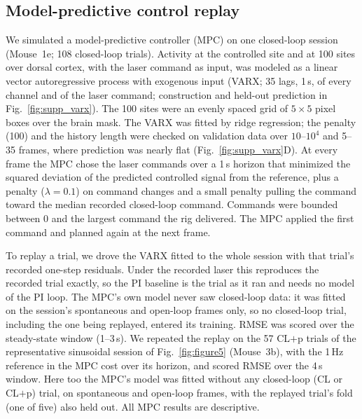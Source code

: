 \subsection*{Model-predictive control replay}
\label{sec:mpc}

We simulated a model-predictive controller (MPC) on one closed-loop session
(Mouse~1e; 108 closed-loop trials). Activity at the controlled site
and at 100 sites over dorsal cortex, with the laser command as input, was
modeled as a linear vector autoregressive process with exogenous input (VARX;
35 lags, 1\,s, of every channel and of the laser command; construction and
held-out prediction in Fig.~\ref{fig:supp_varx}). The 100 sites were an evenly
spaced grid of $5 \times 5$ pixel boxes over the brain mask. The VARX was fitted
by ridge regression; the penalty (100) and the history length were checked on
validation data over $10$--$10^{4}$ and 5--35 frames, where prediction was nearly
flat (Fig.~\ref{fig:supp_varx}D). At
every frame the MPC chose the laser commands over a 1\,s horizon that minimized
the squared deviation of the predicted controlled signal from the reference,
plus a penalty ($\lambda = 0.1$) on command changes and a small penalty pulling
the command toward the median recorded closed-loop command. Commands were
bounded between 0 and the largest command the rig delivered. The MPC applied
the first command and planned again at the next frame.

To replay a trial, we drove the VARX fitted to the whole session with that
trial's recorded one-step residuals. Under the recorded laser this reproduces
the recorded trial exactly, so the PI baseline is the trial as it ran and needs
no model of the PI loop. The MPC's own model never saw closed-loop data: it was
fitted on the session's spontaneous and open-loop frames only, so no closed-loop
trial, including the one being replayed, entered its training. RMSE was scored
over the steady-state window (1--3\,s).
We repeated the replay on the 57 CL$+$p trials of the representative sinusoidal session
of Fig.~\ref{fig:figure5} (Mouse~3b), with the 1\,Hz reference in the MPC cost over its horizon,
and scored RMSE over the 4\,s window. Here too the MPC's model was fitted without
any closed-loop (CL or CL$+$p) trial, on spontaneous and open-loop frames, with the
replayed trial's fold (one of five) also held out. All MPC results are descriptive.

